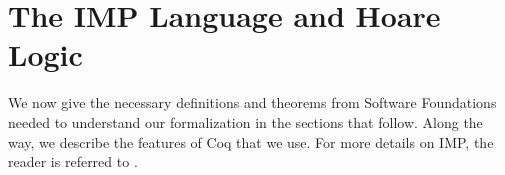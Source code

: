 \documentclass[compsoc,conference,a4paper,10pt,times]{IEEEtran}
\begin{document}

\section{The IMP Language and Hoare Logic}
We now give the necessary definitions and theorems from Software
Foundations \cite{SFV2} needed to understand our formalization in the
sections that follow.  Along the way, we describe the features of Coq
that we use.  
For more details on IMP, the reader is referred to \cite{SFV2}.

\end{document}
